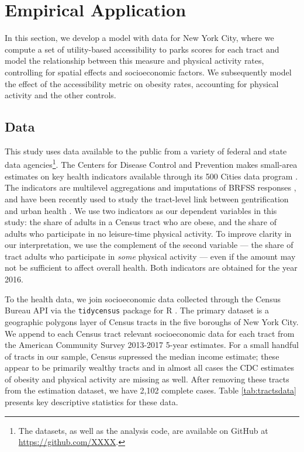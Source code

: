 \documentclass[shortAfour,sageh.bst]{sagej}
\begin{document}
\hypertarget{empirical-application}{%
\section{Empirical Application}\label{empirical-application}}

In this section, we develop a model with data for New York City, where
we compute a set of utility-based accessibility to parks scores for each
tract and model the relationship between this measure and physical
activity rates, controlling for spatial effects and socioeconomic
factors. We subsequently model the effect of the accessibility metric on
obesity rates, accounting for physical activity and the other controls.

\hypertarget{data}{%
\subsection{Data}\label{data}}

This study uses data available to the public from a variety of federal
and state data agencies\footnote{The datasets, as well as the analysis
  code, are available on GitHub at
  \url{https://github.com/XXXX}.}. The Centers
for Disease Control and Prevention makes small-area estimates on key
health indicators available through its 500 Cities data program
\citep{CDC5002016}. The indicators are multilevel aggregations and
imputations of BRFSS responses \citep{Wang2018, Wang2017}, and have been
recently used to study the tract-level link between gentrification and
urban health \citep{Gibbons2018}. We use two indicators as our dependent
variables in this study: the share of adults in a Census tract who are
obese, and the share of adults who participate in no leisure-time
physical activity. To improve clarity in our interpretation, we use the
complement of the second variable --- the share of tract adults who
participate in \emph{some} physical activity --- even if the amount may
not be sufficient to affect overall health. Both indicators are obtained
for the year 2016.

To the health data, we join socioeconomic data collected through the
Census Bureau API via the \texttt{tidycensus} package for R
\citep{Walker2019}. The primary dataset is a geographic polygons layer
of Census tracts in the five boroughs of New York City. We append to
each Census tract relevant socioeconomic data for each tract from the
American Community Survey 2013-2017 5-year estimates. For a small
handful of tracts in our sample, Census supressed the median income
estimate; these appear to be primarily wealthy tracts and in almost all
cases the CDC estimates of obesity and physical activity are missing as
well. After removing these tracts from the estimation dataset, we have
2,102 complete cases. Table \ref{tab:tractsdata} presents key
descriptive statistics for these data.
\end{document}
